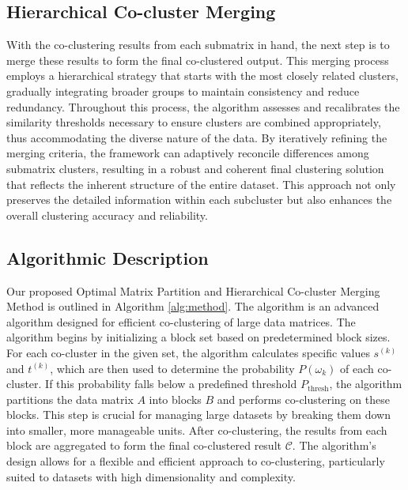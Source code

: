 \subsection{Hierarchical Co-cluster Merging}

With the co-clustering results from each submatrix in hand, the next step is to merge these results to form the final co-clustered output. This merging process employs a hierarchical strategy that starts with the most closely related clusters, gradually integrating broader groups to maintain consistency and reduce redundancy. Throughout this process, the algorithm assesses and recalibrates the similarity thresholds necessary to ensure clusters are combined appropriately, thus accommodating the diverse nature of the data. By iteratively refining the merging criteria, the framework can adaptively reconcile differences among submatrix clusters, resulting in a robust and coherent final clustering solution that reflects the inherent structure of the entire dataset. This approach not only preserves the detailed information within each subcluster but also enhances the overall clustering accuracy and reliability.

\subsection{Algorithmic Description}
Our proposed  Optimal Matrix Partition and Hierarchical Co-cluster Merging Method is outlined in Algorithm \ref{alg:method}. The algorithm
is an advanced algorithm designed for efficient co-clustering of large data matrices. The algorithm begins by initializing a block set based on predetermined block sizes. For each co-cluster in the given set, the algorithm calculates specific values $s^{(k)}$ and $t^{(k)}$, which are then used to determine the probability $P(\omega_k)$ of each co-cluster. If this probability falls below a predefined threshold $P_{\text{thresh}}$, the algorithm partitions the data matrix $A$ into blocks $B$ and performs co-clustering on these blocks. This step is crucial for managing large datasets by breaking them down into smaller, more manageable units. After co-clustering, the results from each block are aggregated to form the final co-clustered result $\mathcal{C}$. The algorithm's design allows for a flexible and efficient approach to co-clustering, particularly suited to datasets with high dimensionality and complexity.
